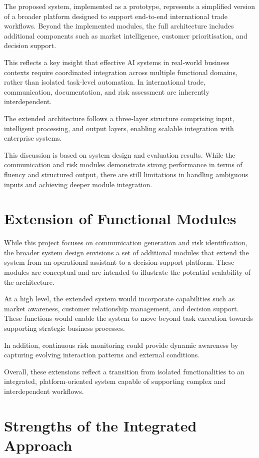 \documentclass[12pt,a4paper]{report}
\begin{document}
The proposed system, implemented as a prototype, represents a simplified version of a broader platform designed to support end-to-end international trade workflows. Beyond the implemented modules, the full architecture includes additional components such as market intelligence, customer prioritisation, and decision support.

This reflects a key insight that effective AI systems in real-world business contexts require coordinated integration across multiple functional domains, rather than isolated task-level automation. In international trade, communication, documentation, and risk assessment are inherently interdependent.

The extended architecture follows a three-layer structure comprising input, intelligent processing, and output layers, enabling scalable integration with enterprise systems.

This discussion is based on system design and evaluation results. While the communication and risk modules demonstrate strong performance in terms of fluency and structured output, there are still limitations in handling ambiguous inputs and achieving deeper module integration.

\section{Extension of Functional Modules}

While this project focuses on communication generation and risk identification, the broader system design envisions a set of additional modules that extend the system from an operational assistant to a decision-support platform. These modules are conceptual and are intended to illustrate the potential scalability of the architecture.

At a high level, the extended system would incorporate capabilities such as market awareness, customer relationship management, and decision support. These functions would enable the system to move beyond task execution towards supporting strategic business processes.

In addition, continuous risk monitoring could provide dynamic awareness by capturing evolving interaction patterns and external conditions.

Overall, these extensions reflect a transition from isolated functionalities to an integrated, platform-oriented system capable of supporting complex and interdependent workflows.

\section{Strengths of the Integrated Approach}
\end{document}

